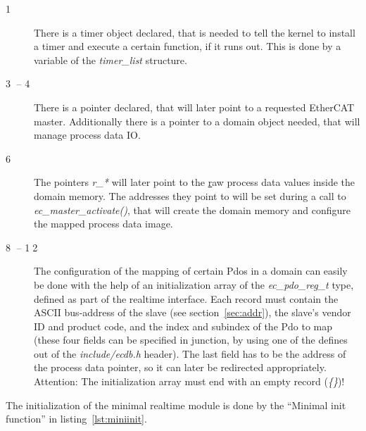 \documentclass[a4paper,12pt,BCOR6mm,bibtotoc,idxtotoc]{scrbook}
\begin{document}
\begin{description}
\item[\normalfont\textcircled{\tiny 1}] There is a timer object
  declared, that is needed to tell the kernel to install a timer and
  execute a certain function, if it runs out. This is done by a
  variable of the \textit{timer\_list} structure.
\item[\normalfont\textcircled{\tiny 3} -- \textcircled{\tiny 4}] There
  is a pointer declared, that will later point to a requested EtherCAT
  master.  Additionally there is a pointer to a domain object needed,
  that will manage process data IO.
\item[\normalfont\textcircled{\tiny 6}] The pointers \textit{r\_*}
  will later point to the \underline{r}aw process data values inside
  the domain memory. The addresses they point to will be set during a
  call to \textit{ec\_\-master\_\-activate()}, that will create the
  domain memory and configure the mapped process data image.
\item[\normalfont\textcircled{\tiny 8} -- \textcircled{\tiny 12}] The
  configuration of the mapping of certain Pdos in a domain can easily
  be done with the help of an initialization array of the
  \textit{ec\_pdo\_reg\_t} type, defined as part of the realtime
  interface. Each record must contain the ASCII bus-address of the
  slave (see section~\ref{sec:addr}), the slave's vendor ID and
  product code, and the index and subindex of the Pdo to map (these
  four fields can be specified in junction, by using one of the
  defines out of the \textit{include/ecdb.h} header). The last field
  has to be the address of the process data pointer, so it can later
  be redirected appropriately. Attention: The initialization array
  must end with an empty record (\textit{\{\}})!
\end{description}

The initialization of the minimal realtime module is done by the
``Minimal init function'' in listing~\ref{lst:miniinit}.
\end{document}
